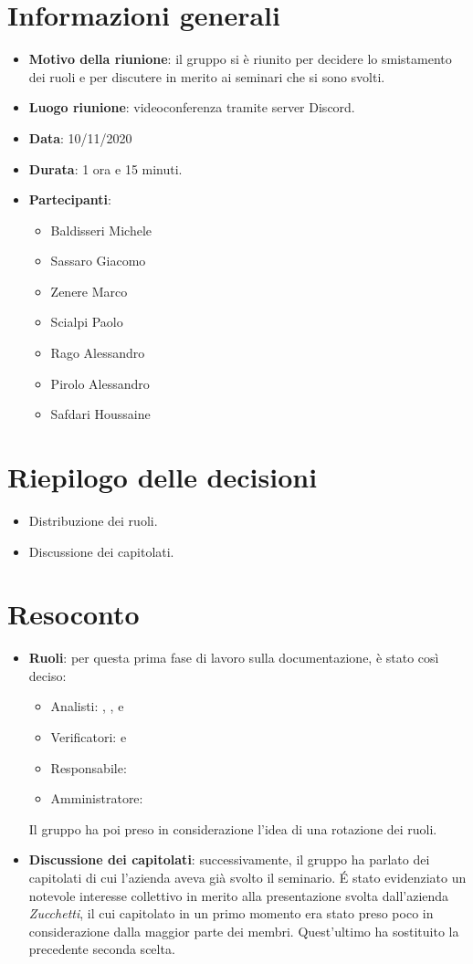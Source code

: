 \section{Informazioni generali}
\begin{itemize}
\item \textbf{Motivo della riunione}: il gruppo si è riunito per decidere lo smistamento dei ruoli e per discutere in merito ai seminari che si sono svolti.
\item \textbf{Luogo riunione}: videoconferenza tramite server Discord.
\item \textbf{Data}: 10/11/2020
\item \textbf{Durata}: 1 ora e 15 minuti.
\item \textbf{Partecipanti}:
	\begin{itemize}
	\item Baldisseri Michele
	\item Sassaro Giacomo
	\item Zenere Marco
	\item Scialpi Paolo
	\item Rago Alessandro
	\item Pirolo Alessandro
	\item Safdari Houssaine
	\end{itemize}
\end{itemize}
\section{Riepilogo delle decisioni}
\begin{itemize}
\item Distribuzione dei ruoli.
\item Discussione dei capitolati.
\end{itemize}
\section{Resoconto}
\begin{itemize}
\item \textbf{Ruoli}: per questa prima fase di lavoro sulla documentazione, è stato così deciso:
\begin{itemize}
\item Analisti: \SH{}, \ZM{}, \RA{} e \SP{}
\item Verificatori: \PA{} e \BM{} 
\item Responsabile: \SG{}
\item Amministratore: \BM{}
\end{itemize}
Il gruppo ha poi preso in considerazione l'idea di una rotazione dei ruoli.

\item \textbf{Discussione dei capitolati}: successivamente, il gruppo ha parlato dei capitolati di cui l'azienda aveva già svolto il seminario. \'E stato evidenziato un notevole interesse collettivo in merito alla presentazione svolta dall'azienda \textit{Zucchetti}, il cui capitolato in un primo momento era stato preso poco in considerazione dalla maggior parte dei membri. Quest'ultimo ha sostituito la precedente seconda scelta.
\end{itemize}